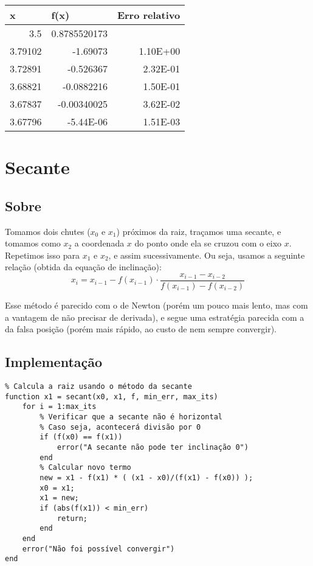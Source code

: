 \documentclass[12pt]{article}
\begin{document}
\begin{table}[H]
\centering
\begin{tabular}{@{}rrr@{}}
\toprule
\multicolumn{1}{l}{x} & \multicolumn{1}{l}{f(x)} & \multicolumn{1}{l}{Erro relativo} \\ \midrule
3.5                   & 0.8785520173             & \multicolumn{1}{l}{}              \\
3.79102               & -1.69073                 & 1.10E+00                          \\
3.72891               & -0.526367                & 2.32E-01                          \\
3.68821               & -0.0882216               & 1.50E-01                          \\
3.67837               & -0.00340025              & 3.62E-02                          \\
3.67796               & -5.44E-06                & 1.51E-03                          \\ \bottomrule
\end{tabular}
\end{table}

\section{Secante}
\subsection{Sobre}
Tomamos dois chutes (\(x_0\) e \(x_1\)) próximos da raiz, traçamos uma secante, e tomamos como \(x_2\) a coordenada \(x\) do ponto onde ela se cruzou com o eixo \(x\). Repetimos isso para \(x_1\) e \(x_2\), e assim sucessivamente. Ou seja, usamos a seguinte relação (obtida da equação de inclinação):
\[x_{i} = x_{i-1} - f(x_{i-1}) \cdot \frac{x_{i-1} - x_{i-2}}{f(x_{i-1}) - f(x_{i-2})}\]

Esse método é parecido com o de Newton (porém um pouco mais lento, mas com a vantagem de não precisar de derivada), e segue uma estratégia parecida com a da falsa posição (porém mais rápido, ao custo de nem sempre convergir).

\subsection{Implementação}
\begin{verbatim}
% Calcula a raiz usando o método da secante
function x1 = secant(x0, x1, f, min_err, max_its)
    for i = 1:max_its
        % Verificar que a secante não é horizontal
        % Caso seja, acontecerá divisão por 0
        if (f(x0) == f(x1))
            error("A secante não pode ter inclinação 0")
        end
        % Calcular novo termo
        new = x1 - f(x1) * ( (x1 - x0)/(f(x1) - f(x0)) );
        x0 = x1;
        x1 = new;
        if (abs(f(x1)) < min_err)
            return;
        end
    end
    error("Não foi possível convergir")
end
\end{verbatim}
\end{document}
